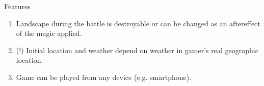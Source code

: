 \documentclass[pdf]{beamer}
\newcommand{\red}[1]{{\color[rgb]{0.6,0,0}#1}}
\begin{document}
\begin{frame}{Features}
	\begin{enumerate}
		\large
		\item Landscape during the battle is destroyable or can be changed as an aftereffect of the magic applied.
		\item \red{(!)} Initial location and weather depend on weather in gamer's \red{real} geographic location.
		\item Game can be played from any device (e.g. smartphone).
	\end{enumerate}
\end{frame}
\end{document}
